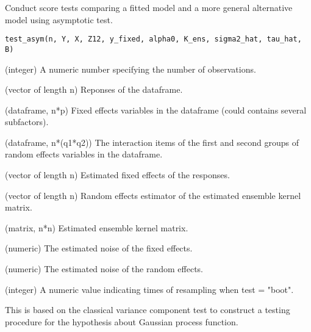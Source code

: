\documentclass[a4paper]{book}
\begin{document}
%
\begin{Description}\relax
Conduct score tests comparing a fitted model and a more general alternative
model using asymptotic test.
\end{Description}
%
\begin{Usage}
\begin{verbatim}
test_asym(n, Y, X, Z12, y_fixed, alpha0, K_ens, sigma2_hat, tau_hat, B)
\end{verbatim}
\end{Usage}
%
\begin{Arguments}
\begin{ldescription}
\item[\code{n}] (integer) A numeric number specifying the number of observations.

\item[\code{Y}] (vector of length n) Reponses of the dataframe.

\item[\code{X}] (dataframe, n*p) Fixed effects variables in the dataframe (could
contains several subfactors).

\item[\code{Z12}] (dataframe, n*(q1\bsl{}*q2)) The interaction items of the first and
second groups of random effects variables in the dataframe.

\item[\code{y\_fixed}] (vector of length n) Estimated fixed effects of the
responses.

\item[\code{alpha0}] (vector of length n) Random effects estimator of the estimated
ensemble kernel matrix.

\item[\code{K\_ens}] (matrix, n*n) Estimated ensemble kernel matrix.

\item[\code{sigma2\_hat}] (numeric) The estimated noise of the fixed effects.

\item[\code{tau\_hat}] (numeric) The estimated noise of the random effects.

\item[\code{B}] (integer) A numeric value indicating times of resampling when test
= "boot".
\end{ldescription}
\end{Arguments}
%
\begin{Details}\relax
{}

This is based on the classical variance component test to construct a
testing procedure for the hypothesis about Gaussian process function.
\end{Details}
\end{document}
